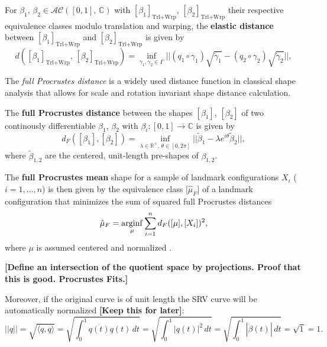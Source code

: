 \begin{definition}
  For $\beta_1$, $\beta_2 \in \mathcal{AC}([0,1],\,\mathbb{C})$ with $[\beta_1]_{\text{Trl+Wrp}}$, $[\beta_2]_{\text{Trl+Wrp}}$ their respective equivalence classes modulo translation and warping, the \textbf{elastic distance} between $[\beta_1]_{\text{Trl+Wrp}}$ and $[\beta_2]_{\text{Trl+Wrp}}$ is given by
  $$d([\beta_1]_{\text{Trl+Wrp}},\, [\beta_2]_{\text{Trl+Wrp}}) = \inf_{\gamma_1, \gamma_2 \in \Gamma} || (q_1 \circ \gamma_1) \sqrt{\dot\gamma_1}- (q_2 \circ \gamma_2) \sqrt{\dot\gamma_2} ||,$$
\end{definition}

The \textit{full Procrustes distance} is a widely used distance function in
classical shape analysis that allows for scale and rotation invariant shape
distance calculation.
\begin{definition}
  The \textbf{full Procrustes distance} between the shapes $[\beta_1]$,
  $[\beta_2]$ of two continously differentiable $\beta_1$, $\beta_2$ with
  $\beta_i : [0,1] \rightarrow \mathbb{C}$ is given by 
    $$d_F([\beta_1], [\beta_2]) = \inf_{\lambda \in \mathbb{R}^+,\, \theta \in
    [0,2\pi]} ||\tilde{\beta}_1 - \lambda e^{i\theta} \tilde{\beta}_2||, $$
    where $\tilde\beta_{1,2}$ are the centered, unit-length pre-shapes of
    $\beta_{1,2}$.
\end{definition}
\begin{definition}
    The \textbf{full Procrustes mean} shape for a sample of landmark
    configurations $X_i$ ($i = 1,\dots,n$) is then given by the equivalence
    class [$\hat\mu_F$] of a landmark configuration that minimizes the sum of
    squared full Procrustes distances
    $$\hat{\mu}_F = \operatorname*{arginf}_{\mu} \sum_{i=1}^n d_F([\mu], [X_i])^2, $$
    where $\mu$ is assumed centered and normalized
    \parencites[see][71,114]{DrydenMardia2016}.
\end{definition}

\textbf{[Define an intersection of the quotient space by projections. Proof that this is good. Procrustes Fits.]}

Moreover, if the original curve is of unit length the SRV curve will be automatically normalized \textbf{[Keep this for later]}:
$$ ||q|| = \sqrt{\langle q, q \rangle} = \sqrt{ \int_0^1 \overline{q(t)} q(t) \, dt } = \sqrt{ \int_0^1 |q(t)|^2 \, dt} = \sqrt{\int_0^1 |\dot{\beta}(t)| \, dt} = \sqrt{1} = 1. $$



